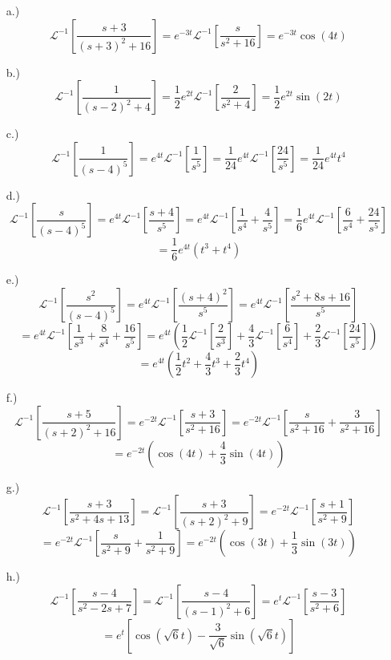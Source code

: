 \documentclass[12pt]{article}
\newcommand{\bracks}[1]{\left[#1\right]}
\newcommand{\parns}[1]{\left(#1\right)}
\newcommand{\lpi}{\mathcal{L}^{-1}}
\begin{document}
\begin{itemize}
    \item [a.)] \[\lpi\bracks{\frac{s+3}{(s+3)^2+16}}=e^{-3t}\lpi\bracks{\frac{s}{s^2+16}}=e^{-3t}\cos(4t)\]

    \item [b.)] \[\lpi\bracks{\frac{1}{(s-2)^2+4}}=\frac{1}{2}e^{2t}\lpi\bracks{\frac{2}{s^2+4}}=\frac{1}{2}e^{2t}\sin(2t)\]

    \item [c.)] \[\lpi\bracks{\frac{1}{(s-4)^5}}=e^{4t}\lpi\bracks{\frac{1}{s^5}}=\frac{1}{24}e^{4t}\lpi\bracks{\frac{24}{s^5}}=\frac{1}{24}e^{4t}t^4\]

    \item [d.)] \[\lpi\bracks{\frac{s}{(s-4)^5}}=e^{4t}\lpi\bracks{\frac{s+4}{s^5}}=e^{4t}\lpi\bracks{\frac{1}{s^4}+\frac{4}{s^5}}=\frac{1}{6}e^{4t}\lpi\bracks{\frac{6}{s^4}+\frac{24}{s^5}}\]
    \[=\frac{1}{6}e^{4t}(t^3+t^4)\]

    \item [e.)] \[\lpi\bracks{\frac{s^2}{(s-4)^5}}=e^{4t}\lpi\bracks{\frac{(s+4)^2}{s^5}}=e^{4t}\lpi\bracks{\frac{s^2+8s+16}{s^5}}\]
    \[=e^{4t}\lpi\bracks{\frac{1}{s^3}+\frac{8}{s^4}+\frac{16}{s^5}}=e^{4t}\parns{\frac{1}{2}\lpi\bracks{\frac{2}{s^3}}+\frac{4}{3}\lpi\bracks{\frac{6}{s^4}}+\frac{2}{3}\lpi\bracks{\frac{24}{s^5}}}\]
    \[=e^{4t}\parns{\frac{1}{2}t^2+\frac{4}{3}t^3+\frac{2}{3}t^4}\]

    \item [f.)] \[\lpi\bracks{\frac{s+5}{(s+2)^2+16}}=e^{-2t}\lpi\bracks{\frac{s+3}{s^2+16}}=e^{-2t}\lpi\bracks{\frac{s}{s^2+16}+\frac{3}{s^2+16}}\]
    \[=e^{-2t}\parns{\cos(4t)+\frac{4}{3}\sin(4t)}\]

    \item [g.)] \[\lpi\bracks{\frac{s+3}{s^2+4s+13}}=\lpi\bracks{\frac{s+3}{(s+2)^2+9}}=e^{-2t}\lpi\bracks{\frac{s+1}{s^2+9}}\]
    \[=e^{-2t}\lpi\bracks{\frac{s}{s^2+9}+\frac{1}{s^2+9}}=e^{-2t}\parns{\cos(3t)+\frac{1}{3}\sin(3t)}\]

    \item [h.)] \[\lpi\bracks{\frac{s-4}{s^2-2s+7}}=\lpi\bracks{\frac{s-4}{(s-1)^2+6}}=e^t\lpi\bracks{\frac{s-3}{s^2+6}}\]
    \[=e^t\bracks{\cos\parns{\sqrt6 t}-\frac{3}{\sqrt6}\sin\parns{\sqrt6 t}}\]
\end{itemize}
\end{document}
